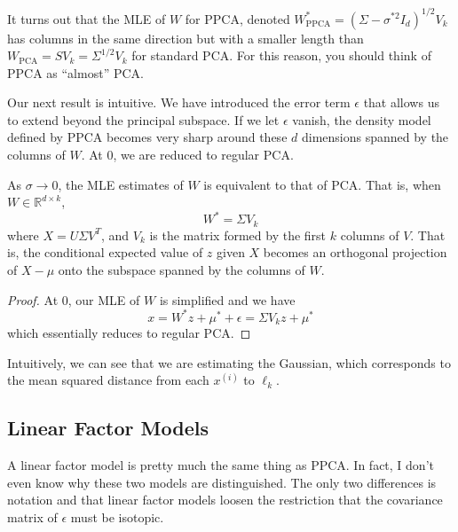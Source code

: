   It turns out that the MLE of $W$ for PPCA, denoted $W_{\mathrm{PPCA}}^\ast = (\Sigma - \sigma^{\ast 2} I_d)^{1/2} V_k$ has columns in the same direction but with a smaller length than $W_{\mathrm{PCA}} = S V_k = \Sigma^{1/2} V_k$ for standard PCA. For this reason, you should think of PPCA as ``almost'' PCA. 

  Our next result is intuitive. We have introduced the error term $\epsilon$ that allows us to extend beyond the principal subspace. If we let $\epsilon$ vanish, the density model defined by PPCA becomes very sharp around these $d$ dimensions spanned by the columns of $W$. At $0$, we are reduced to regular PCA. 

  \begin{theorem} 
    As $\sigma \rightarrow 0$, the MLE estimates of $W$ is equivalent to that of PCA. That is, when $W \in \mathbb{R}^{d \times k}$, 
    \begin{equation}
      W^\ast = \Sigma V_k
    \end{equation} 
    where $X = U \Sigma V^T$, and $V_k$ is the matrix formed by the first $k$ columns of $V$. That is, the conditional expected value of $z$ given $X$ becomes an orthogonal projection of $X - \mu$ onto the subspace spanned by the columns of $W$. 
  \end{theorem}
  \begin{proof}
    At $0$, our MLE of $W$ is simplified and we have 
    \begin{equation}
      x = W^\ast z + \mu^\ast + \epsilon = \Sigma V_k z + \mu^\ast
    \end{equation}
    which essentially reduces to regular PCA. 
  \end{proof}

  Intuitively, we can see that we are estimating the Gaussian, which corresponds to the mean squared distance from each $x^{(i)}$ to $\ell_k$. 

\subsection{Linear Factor Models} 

  A linear factor model is pretty much the same thing as PPCA. In fact, I don't even know why these two models are distinguished. The only two differences is notation and that linear factor models loosen the restriction that the covariance matrix of $\epsilon$ must be isotopic. 

